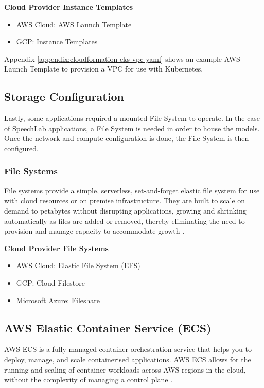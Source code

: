 \textbf{Cloud Provider Instance Templates}
\begin{itemize}
    \vspace{-1em}
\item AWS Cloud: AWS Launch Template
\item GCP: Instance Templates
\end{itemize}

Appendix \ref{appendix:cloudformation-eks-vpc-yaml} shows an example AWS Launch Template to provision a VPC for use with Kubernetes.

\subsection{Storage Configuration}
Lastly, some applications required a mounted File System to operate. In the case of SpeechLab applications, a File System is needed in order to house the models. Once the network and compute
configuration is done, the File System is then configured. 

\subsubsection{File Systems}
File systems provide a simple, serverless, set-and-forget elastic file system for use with cloud resources or on premise infrastructure. They are built to scale on demand to petabytes without disrupting applications, growing and shrinking automatically as files are added or removed, thereby eliminating the need to provision and manage capacity to accommodate growth \cite{aws-no-dateF}. 

\textbf{Cloud Provider File Systems}
\begin{itemize}
    \vspace{-1em}
\item AWS Cloud: Elastic File System (EFS)
\item GCP: Cloud Filestore
\item Microsoft Azure: Fileshare
\end{itemize}


\subsection{AWS Elastic Container Service (ECS)}
AWS ECS is a fully managed container orchestration service that helps you to deploy, manage, and scale containerised applications. AWS ECS allows for the running and scaling of container workloads across AWS regions in the cloud, without the complexity of managing a control plane \cite{aws-ecs}. 

